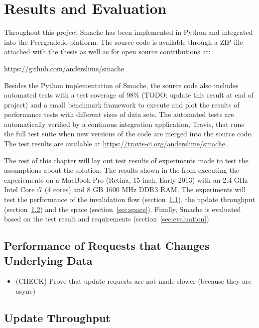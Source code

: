 \chapter{Results and Evaluation}
\label{chapter:tests-and-evaluation}

Throughout this project Smache has been implemented in Python and integrated into the Peergrade.io-platform. The source code is available through a ZIP-file attached with the thesis as well as for open source contributions at:

\url{https://github.com/anderslime/smache}

Besides the Python implementation of Smache, the source code also includes automated tests with a test coverage of 98\% (TODO: update this result at end of project) and a small benchmark framework to execute and plot the results of performance tests with different sizes of data sets. The automated tests are automatically verified by a continous integration application, Travis, that runs the full test suite when new versions of the code are merged into the source code. The test results are available at \url{https://travis-ci.org/anderslime/smache}.

The rest of this chapter will lay out test results of experiments made to test the assumptions about the solution. The results shown in the from executing the experiements on a MacBook Pro (Retina, 15-inch, Early 2013) with an 2.4 GHz Intel Core i7 (4 cores) and 8 GB 1600 MHz DDR3 RAM. The experiments will test the performance of the invalidation flow (section~\ref{sec:performance}), the update throughput (section~\ref{sec:update-throughput}) and the space (section~\ref{sec:space}). Finally, Smache is evaluated based on the test result and requirements (section~\ref{sec:evaluation}).

\section{Performance of Requests that Changes Underlying Data}
\label{sec:performance}

\begin{itemize}
  \item (CHECK) Prove that update requests are not made slower (because they are async)
\end{itemize}


\section{Update Throughput}
\label{sec:update-throughput}

